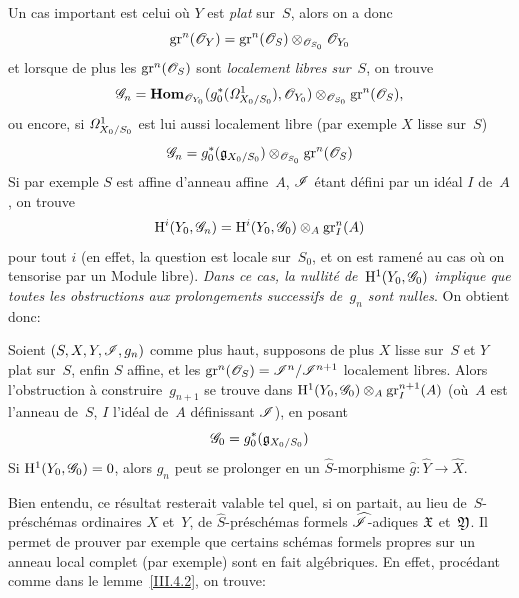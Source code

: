 Un cas important est celui o\`u $Y$ est \emph{plat} sur~$S$, alors
on a donc
\begin{equation*}
\gr^n(\cal{O}_Y)=\gr^n(\cal{O}_S)\otimes_{\cal{O}_{S_0}}\cal{O}_{Y_0}
\end{equation*}
et lorsque de plus les $\gr^n(\cal{O}_S)$ sont \emph{localement libres
sur}~$S$, on trouve
\begin{equation*}
\cal{G}_n=
\SheafHom_{\cal{O}_{Y_0}}(g_0^*(\it{\Omega}_{X_0/S_0}^1),\cal{O}_{Y_0})
\otimes_{\cal{O}_{S_0}}\gr^n(\cal{O}_S),
\end{equation*}
ou encore, si $\it{\Omega}_{X_0/S_0}^1$ est lui aussi localement libre
(par exemple $X$ lisse sur~$S$)
\begin{equation*}
\cal{G}_n=g_0^*(\goth{g}_{X_0/S_0})
\otimes_{\cal{O}_{S_0}}\gr^{n}(\cal{O}_S)
\end{equation*}
Si par exemple $S$ est affine d'anneau affine~$A$, $\cal{I}$ \'etant
d\'efini par un id\'eal $I$ de~$A$, on trouve
\begin{equation*}
\H^i(Y_0,\cal{G}_n)=\H^i(Y_0,\cal{G}_0) \otimes_A\gr_I^n(A)
\end{equation*}
pour tout $i$ (en effet, la question est locale sur~$S_0$, et on est
ramen\'e au cas o\`u on tensorise par un Module libre).
\emph{Dans ce cas, la nullité de~$\H^1(Y_0,\cal{G}_0)$ implique
que toutes les obstructions aux prolongements successifs de~$g_n$ sont
nulles}. On obtient donc:

\begin{corollaire}
\label{III.5.6}
Soient $(S,X,Y,\cal{I},g_n)$ comme plus haut, supposons de plus $X$
lisse sur~$S$ et $Y$ plat sur~$S$, enfin $S$ affine, et les
$\gr^n(\cal{O}_S)=\cal{I}^n/\cal{I}^{n+1}$ localement libres. Alors
l'obstruction \`a construire~$g_{n+1}$ se trouve dans
$\H^1(Y_0,\cal{G}_0)\otimes_A\gr_I^{n+1}(A)$ (o\`u~$A$ est l'anneau
de~$S$, $I$ l'id\'eal de~$A$ d\'efinissant $\cal{I}$), en posant
\begin{equation*}
\cal{G}_0=g_0^*(\goth{g}_{X_0/S_0})
\end{equation*}
Si $\H^1(Y_0,\cal{G}_0)=0$, alors $g_n$ peut se prolonger en un
$\widehat{S}$-morphisme $\widehat{g}\colon\widehat{Y}\to\widehat{X}$.
\end{corollaire}

Bien entendu, ce r\'esultat resterait valable tel quel, si on
partait, au lieu de~$S$-pr\'esch\'emas ordinaires $X$ et~$Y$, de
$\widehat{S}$-pr\'esch\'emas formels $\widehat{\cal{I}}$-adiques
$\goth{X}$ et~$\goth{Y}$. Il permet de prouver par exemple que
certains sch\'emas formels propres sur un anneau local complet (par
exemple) sont en fait alg\'ebriques. En effet, proc\'edant comme
dans le lemme~\ref{III.4.2}, on trouve:

